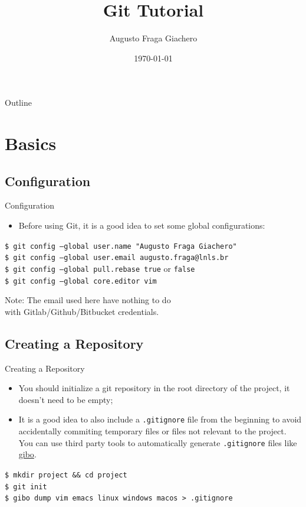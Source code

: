 \documentclass{beamer}
\title{Git Tutorial}
\author{Augusto Fraga Giachero}
\date{\today}
\begin{document}
\begin{frame}
  \titlepage
\end{frame}

\begin{frame}{Outline}
  \tableofcontents
\end{frame}

\section{Basics}

\subsection{Configuration}
\begin{frame}{Configuration}
  \begin{itemize}
    \item Before using Git, it is a good idea to set some global configurations:
  \end{itemize}
  \begin{block}{}
    \texttt{\$ git config --global user.name "Augusto Fraga Giachero"} \\
    \texttt{\$ git config --global user.email augusto.fraga@lnls.br} \\
    \texttt{\$ git config --global pull.rebase true} or \texttt{false} \\
    \texttt{\$ git config --global core.editor vim}
  \end{block}
  \begin{flushright}
    Note: The email used here have nothing to do \\ with Gitlab/Github/Bitbucket credentials.
  \end{flushright}
\end{frame}

\subsection{Creating a Repository}
\begin{frame}{Creating a Repository}
  \begin{itemize}
    \item You should initialize a git repository in the root directory of the project, it doesn't need to be empty;
    \item It is a good idea to also include a \texttt{.gitignore} file from the beginning to avoid accidentally commiting temporary files or files not relevant to the project. You can use third party tools to automatically generate \texttt{.gitignore} files like \href{https://github.com/simonwhitaker/gibo}{gibo}.
  \end{itemize}
  \begin{block}{}
    \texttt{\$ mkdir project \&\& cd project} \\
    \texttt{\$ git init} \\
    \texttt{\$ gibo dump vim emacs linux windows macos > .gitignore}
  \end{block}
\end{frame}
\end{document}
